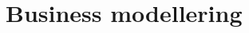 \section{Business modellering}\label{businessmodellering}




\begin{comment}
\subsection{Objekt- og Domænemodeller}
\subsubsection{Objektmodellen}
Halvorsen ApS er et firma med mange ansatte, og et strengt hieraki imellem dem.

Det er derfor nødvendigt at differentiere imellem jobstillinger indenfor firmaet.

Udover personalet skal der differentieres mellem forskellige byggepladser.
 
Der er på et givent tidspunkt en til flere byggepladser, og de skal alle sammen registreres til en eller flere sager, og skal så vidt adskilles. 

Det individuelle sager er adskilt med et sagsid. Et eksempel på en sag, ses på objektet "Tagmontering Etape 1". 

I den sag ser man en forbindelse til byggepladsen, hvor tagmonteringen foregår, og yderligere en forbindelse til svenden Torben, som netop er ude og montere tagene. 

Derudover er objekterne sat op med forbindelser, for hvad de har direkte kontakt med.

Her er selvfølgelig udelukket irrelevante faktorer, som fx. at de alle sammen snakker sammen til årets julefrokost. 
\subsubsection Domænemodellen
Ved et første øjekast på domænemodellen, vil man lægge mærke til, at sekretæren kun har ét forhold. Dette forhold defineres ved en én til én forbindelse til tømrermesteren. Som en af de primære brugere af programmet, kan hun derigennem få fuld adgang til resten af firmaet gennem netop tømrermesteren.
\end{comment}
